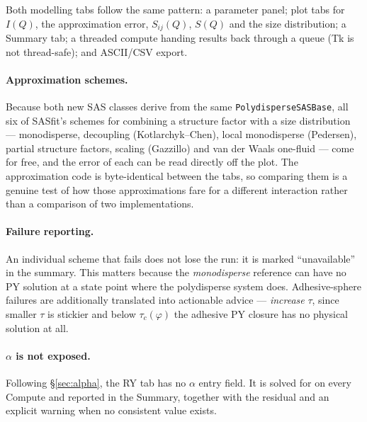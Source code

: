 \documentclass[11pt,a4paper]{article}
\newcommand{\code}[1]{\texttt{\hspace{0pt}#1}}
\begin{document}
Both modelling tabs follow the same pattern: a parameter panel; plot tabs for
$I(Q)$, the approximation error, $S_{ij}(Q)$, $S(Q)$ and the size
distribution; a Summary tab; a threaded compute handing results back through a
queue (Tk is not thread-safe); and ASCII/CSV export.

\paragraph{Approximation schemes.} Because both new SAS classes derive from
the same \code{PolydisperseSASBase}, all six of SASfit's schemes for combining
a structure factor with a size distribution --- monodisperse, decoupling
(Kotlarchyk--Chen), local monodisperse (Pedersen), partial structure factors,
scaling (Gazzillo) and van der Waals one-fluid --- come for free, and the
error of each can be read directly off the plot. The approximation code is
byte-identical between the tabs, so comparing them is a genuine test of how
those approximations fare for a different interaction rather than a comparison
of two implementations.

\paragraph{Failure reporting.} An individual scheme that fails does not lose
the run: it is marked ``unavailable'' in the summary. This matters because the
\emph{monodisperse} reference can have no PY solution at a state point where
the polydisperse system does. Adhesive-sphere failures are additionally
translated into actionable advice --- \emph{increase} $\tau$, since smaller
$\tau$ is stickier and below $\tau_c(\varphi)$ the adhesive PY closure has no
physical solution at all.

\paragraph{$\alpha$ is not exposed.} Following \S\ref{sec:alpha}, the RY tab
has no $\alpha$ entry field. It is solved for on every Compute and reported in
the Summary, together with the residual and an explicit warning when no
consistent value exists.
\end{document}
